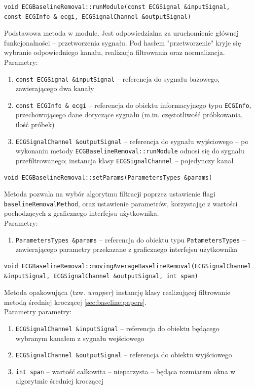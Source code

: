 \documentclass[a4paper, 11pt]{article}
\begin{document}
\begin{lstlisting}
void ECGBaselineRemoval::runModule(const ECGSignal &inputSignal, 
const ECGInfo & ecgi, ECGSignalChannel &outputSignal)
\end{lstlisting}
Podstawowa metoda w module. Jest odpowiedzialna za uruchomienie głównej funkcjonalności -- przetworzenia sygnału. Pod hasłem "przetworzenie" kryje się wybranie odpowiedniego kanału, realizacja filtrowania oraz normalizacja. \\
Parametry:
\begin{enumerate}
\item \verb|const ECGSignal &inputSignal| -- referencja do sygnału bazowego, zawierającego dwa kanały
\item \verb|const ECGInfo & ecgi| -- referencja do obiektu informacyjnego typu \verb|ECGInfo|, przechowującego dane dotyczące sygnału (m.in. częstotliwość próbkowania, ilość próbek)
\item \verb|ECGSignalChannel &outputSignal| -- referencja do sygnału wyjściowego -- po wykonaniu metody \verb|ECGBaselineRemoval::runModule| odnosi się do sygnału przefiltrowanego; instancja klasy \verb|ECGSignalChannel| -- pojedynczy kanał
\end{enumerate}

\begin{lstlisting}
void ECGBaselineRemoval::setParams(ParametersTypes &params)
\end{lstlisting}
Metoda pozwala na wybór algorytmu filtracji poprzez ustawienie flagi \verb|baselineRemovalMethod|, oraz ustawienie parametrów, korzystając z wartości pochodzących z graficznego interfejsu użytkownika. \\
Parametry:
\begin{enumerate}
\item \verb|ParametersTypes &params| -- referencja do obiektu typu \verb|PatametersTypes| -- zawierającego parametry przekazane z graficznego interfejsu użytkownika
\end{enumerate}

\begin{lstlisting}
void ECGBaselineRemoval::movingAverageBaselineRemoval(ECGSignalChannel 
&inputSignal, ECGSignalChannel &outputSignal, int span)
\end{lstlisting}
Metoda opakowująca (tzw. \textit{wrapper}) instancję klasy realizującej filtrowanie metodą średniej kroczącej \ref{sec:baseline:papers}. \\
Parametry parametry:
\begin{enumerate}
\item \verb|ECGSignalChannel &inputSignal| -- referencja do obiektu będącego wybranym kanałem z sygnału wejściowego
\item \verb|ECGSignalChannel &outputSignal| -- referencja do obiektu wyjściowego
\item \verb|int span| -- wartość całkowita -- nieparzysta -- będąca rozmiarem okna w algorytmie średniej kroczącej
\end{enumerate}
\end{document}
